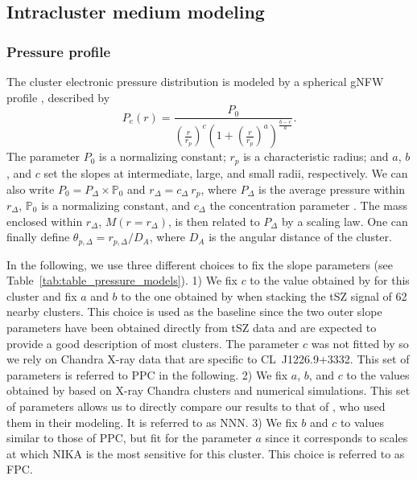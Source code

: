 \documentclass[twocolumn,traditabstract]{aa}
\begin{document}
\subsection{Intracluster medium modeling}\label{sec:icm_parametrization}
\subsubsection{Pressure profile}\label{sec:icm_param_p}
The cluster electronic pressure distribution is modeled by a spherical gNFW profile \citep{nagai2007}, described by
\begin{equation}
	P_e(r) = \frac{P_0}{\left(\frac{r}{r_p}\right)^c \left(1+\left(\frac{r}{r_p}\right)^a\right)^{\frac{b-c}{a}}}.
\label{eq:gNFW}
\end{equation}
The parameter $P_0$ is a normalizing constant; $r_p$ is a characteristic radius; and $a$, $b$, and $c$ set the slopes at intermediate, large, and small radii, respectively. We can also write $P_0 = P_{\Delta} \times \mathds{P}_0$ and $r_{\Delta} = c_{\Delta} \ r_p$, where $P_{\Delta}$ is the average pressure within $r_{\Delta}$, $\mathds{P}_0$ is a normalizing constant, and $c_{\Delta}$ the concentration parameter \citep{arnaud2010}. The mass enclosed within $r_{\Delta}$, $M(r = r_{\Delta})$, is then related to $P_{\Delta}$ by a scaling law. One can finally define $\theta_{p,\Delta} = r_{p,\Delta} / D_A$, where $D_A$ is the angular distance of the cluster.

In the following, we use three different choices to fix the slope parameters (see Table~\ref{tab:table_pressure_models}). 1) We fix $c$ to the value obtained by \cite{comis2011} for this cluster and fix $a$ and $b$ to the one obtained by \cite{planck2013pressure_profile} when stacking the tSZ signal of 62 nearby clusters. This choice is used as the baseline since the two outer slope parameters have been obtained directly from tSZ data and are expected to provide a good description of most clusters. The parameter $c$ was not fitted by \cite{planck2013pressure_profile} so we rely on Chandra \mbox{X-ray} data that are specific to \mbox{CL~J1226.9+3332}. This set of parameters is referred to PPC in the following. 2) We fix $a$, $b$, and $c$ to the values obtained by \cite{nagai2007b} based on \mbox{X-ray} Chandra clusters and numerical simulations. This set of parameters allows us to directly compare our results to that of \cite{mroczkowski2009}, who used them in their modeling. It is referred to as NNN. 3) We fix $b$ and $c$ to values similar to those of PPC, but fit for the parameter $a$ since it corresponds to scales at which NIKA is the most sensitive for this cluster. This choice is referred to as FPC. 
\end{document}
